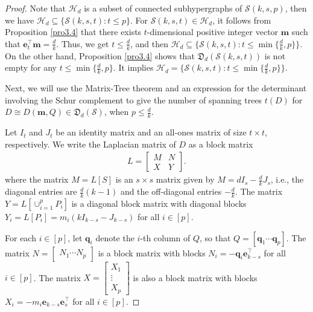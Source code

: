 \documentclass{article}
\begin{document}
\begin{proof}
Note that $\mathcal{H}_{d}$ is a subset of connected subhypergraphs of $\mathcal{S}(k,s,p)$,
then we have $\mathcal{H}_{d}\subseteq\{\mathcal{S}(k,s,t): t\leq p\}$.
For $\mathcal{S}(k,s,t) \in \mathcal{H}_{d}$,
it follows from Proposition \ref{pro3.4} that there exists $t$-dimensional positive integer vector  $\mathbf{m}$ such that $\mathbf{e}^\top_t \mathbf{m}=\frac{d}{k}$.
Thus, we get $t \leq \frac{d}{k}$, and then $\mathcal{H}_d\subseteq\{\mathcal{S}(k,s,t): t\leq \min\{\frac{d}{k},p\}\}$.
On the other hand,
Proposition \ref{pro3.4} shows that $\mathfrak{D}_d(\mathcal{S}(k,s,t) )$ is not empty for any $t\leq \min\{\frac{d}{k},p\}$.
It implies $\mathcal{H}_d=\{\mathcal{S}(k,s,t): t\leq \min\{\frac{d}{k},p\}\}$.

Next, we will use the Matrix-Tree theorem \cite{duval2009simplicial} and an expression for the determinant involving the Schur complement \cite{brualdi1983determinantal} to give the number of spanning trees $t(D)$ for $ D \cong D(\mathbf{m},Q) \in \mathfrak{D}_d(\mathcal{S})$, when $p \leq \frac{d}{k}$.

Let $I_{t}$ and $J_{t}$ be an identity matrix and an all-ones matrix of size $t \times t$, respectively.
We write the Laplacian matrix of $D$ as a block matrix
\begin{align*}
L=\begin{bmatrix} M & N \\ X & Y \end{bmatrix}.
\end{align*}
where the matrix $M=L[S]$ is an $s \times s$ matrix given by $M=dI_{s}-\frac{d}{k}J_{s}$, i.e., the diagonal entries are $\frac{d}{k}(k-1)$ and the off-diagonal entries $-\frac{d}{k}$.
The matrix $Y=L[\cup_{i=1}^pP_i]$ is a diagonal block matrix with diagonal blocks $Y_{i}=L[P_i]=m_{i}(kI_{k-s}-J_{k-s})$ for all $i \in [p]$.

For each $i \in [p]$, let $\mathbf{q}_i$ denote the $i$-th column of $Q$,  so that $Q=[\mathbf{q}_1\cdots\mathbf{q}_p]$.
The matrix $N=\begin{bmatrix} N_{1}  \cdots  N_{p} \end{bmatrix}$ is a block matrix with blocks $N_{i}=-\mathbf{q}_i\mathbf{e}_{k-s}^{\top}$ for all $i \in [p]$.
The matrix $X=\begin{bmatrix} X_{1} \\ \vdots \\ X_{p} \end{bmatrix}$ is also a block matrix with blocks $X_{i}=-m_{i}\mathbf{e}_{k-s}\mathbf{e}_{s}^{\top}$ for all $i \in [p]$.


\end{proof}
\end{document}
